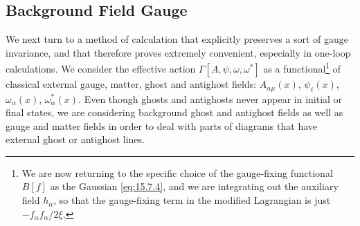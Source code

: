 \subsection{Background Field Gauge}

We next turn to a method of calculation that explicitly preserves a sort of
gauge invariance, and that therefore proves extremely convenient, especially
in one-loop calculations. We consider the effective action
$\Gamma[A,\psi,\omega,\omega^*]$ as a functional\footnote{We are now returning to the specific choice of the gauge-fixing functional $B[f]$ as the Gaussian \eqref{eq:15.7.4}, and we are integrating out the auxiliary field $h_\alpha$, so that the gauge-fixing term in the modified Lagrangian is just $-f_\alpha f_\alpha/2\xi$.}
of classical external gauge, matter, ghost and antighost fields:
$A_{\alpha\mu}(x)$, $\psi_\ell(x)$, $\omega_\alpha(x)$,
$\omega_\alpha^*(x)$. Even though ghosts and antighosts never appear in
initial or final states, we are considering background ghost and antighost
fields as well as gauge and matter fields in order to deal with parts of
diagrams that have external ghost or antighost lines.

